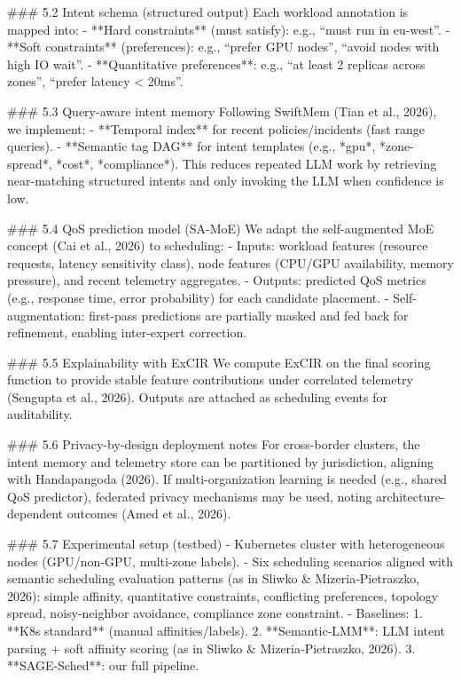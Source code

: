 ### 5.2 Intent schema (structured output)
Each workload annotation is mapped into:
- **Hard constraints** (must satisfy): e.g., “must run in eu-west”.
- **Soft constraints** (preferences): e.g., “prefer GPU nodes”, “avoid nodes with high IO wait”.
- **Quantitative preferences**: e.g., “at least 2 replicas across zones”, “prefer latency < 20ms”.

### 5.3 Query-aware intent memory
Following SwiftMem (Tian et al., 2026), we implement:
- **Temporal index** for recent policies/incidents (fast range queries).
- **Semantic tag DAG** for intent templates (e.g., *gpu*, *zone-spread*, *cost*, *compliance*).
This reduces repeated LLM work by retrieving near-matching structured intents and only invoking the LLM when confidence is low.

### 5.4 QoS prediction model (SA-MoE)
We adapt the self-augmented MoE concept (Cai et al., 2026) to scheduling:
- Inputs: workload features (resource requests, latency sensitivity class), node features (CPU/GPU availability, memory pressure), and recent telemetry aggregates.
- Outputs: predicted QoS metrics (e.g., response time, error probability) for each candidate placement.
- Self-augmentation: first-pass predictions are partially masked and fed back for refinement, enabling inter-expert correction.

### 5.5 Explainability with ExCIR
We compute ExCIR on the final scoring function to provide stable feature contributions under correlated telemetry (Sengupta et al., 2026). Outputs are attached as scheduling events for auditability.

### 5.6 Privacy-by-design deployment notes
For cross-border clusters, the intent memory and telemetry store can be partitioned by jurisdiction, aligning with Handapangoda (2026). If multi-organization learning is needed (e.g., shared QoS predictor), federated privacy mechanisms may be used, noting architecture-dependent outcomes (Amed et al., 2026).

### 5.7 Experimental setup (testbed)
- Kubernetes cluster with heterogeneous nodes (GPU/non-GPU, multi-zone labels).
- Six scheduling scenarios aligned with semantic scheduling evaluation patterns (as in Sliwko & Mizeria‑Pietraszko, 2026): simple affinity, quantitative constraints, conflicting preferences, topology spread, noisy-neighbor avoidance, compliance zone constraint.
- Baselines:
  1. **K8s standard** (manual affinities/labels).
  2. **Semantic-LMM**: LLM intent parsing + soft affinity scoring (as in Sliwko & Mizeria‑Pietraszko, 2026).
  3. **SAGE-Sched**: our full pipeline.

